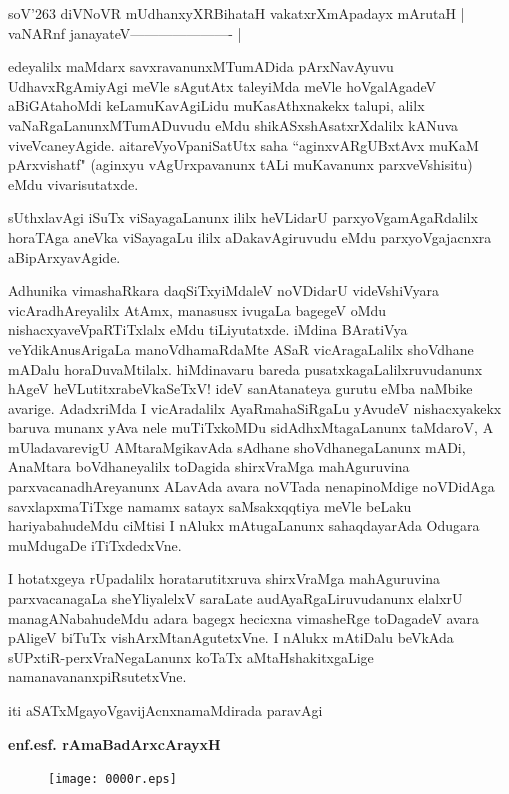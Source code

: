 \begin{shloka}
soV\char'263 diVNoVR mUdhanxyXRBihataH vakatxrXmApadayx mArutaH |\\
vaNARnf janayateV---------------------- |\\
\end{shloka}

edeyalilx maMdarx savxravanunxMTumADida pArxNavAyuvu UdhavxRgAmiyAgi meVle sAgutAtx tale\-yiMda meVle hoVgalAgadeV aBiGAtahoMdi keLamuKa\-vAgiLidu muKasAthxnakekx talupi, alilx vaNaR\-gaLa\-nunxMTu\-mADuvudu eMdu shikASx\-shAsatxrXdalilx kANuva viveVcaneyAgide. aitareVyoVpaniSatUtx saha ``aginxvARgUBxtAvx muKaM pArxvishatf" (aginxyu vAgUrxpavanunx tALi muKavanunx parxveVshisitu) eMdu vivarisutatxde.

sUthxlavAgi iSuTx viSayagaLanunx ililx heVLidarU parxyoVgamAgaRdalilx horaTAga aneVka viSaya\-gaLu ililx aDakavAgiruvudu eMdu parxyoVgajacnxra aBipArxyavAgide.

Adhunika vimashaRkara daqSiTxyiMdaleV noVDidarU videVshiVyara vicAra\-dhAreyalilx AtAmx, manasusx\- ivu\-gaLa bagegeV oMdu nishacxyaveVpaRTiTxlalx eMdu tiLiyutatxde. iMdina BAratiVya veYdikAnu\-sAri\-gaLa manoVdhamaRdaMte ASaR vicAragaLalilx shoVdhane mADalu horaDuvaMtilalx. hiMdinavaru bareda pusatxkagaLalilxruvudanunx hAgeV heVLutitxrabeVkaSeTxV! ideV sanAtanateya gurutu eMba naMbike avarige. AdadxriMda I vicAradalilx AyaRmahaSiRgaLu yAvudeV nishacxyakekx baruva munanx yAva nele muTiTx\-koMDu sidAdhxMtagaLanunx taMdaroV, A mUladavarevigU AMtaraMgikavAda sAdhane shoVdhanegaLanunx mADi, AnaMtara boVdhaneyalilx toDagida shirxVraMga mahAguruvina parxvacanadhAreyanunx ALavAda avara noVTada nenapinoMdige noVDidAga savxlapxmaTiTxge namamx satayx saMsakxqqtiya meVle beLaku hariyabahudeMdu ciMtisi I nAlukx mAtugaLanunx sahaqdayarAda Odugara muMdugaDe iTiTxdedxVne. 

I hotatx\-geya rUpa\-dalilx horatarutitxruva shirxVraMga mahAguruvina parxvacanagaLa sheYliyalelxV saraLate audAyaR\-gaLiruvu\-danunx elalxrU managANabahudeMdu adara bagegx hecicxna vimasheRge toDagadeV avara pAligeV biTuTx vishArxMta\-nAgutetxVne. I nAlukx mAtiDalu beVkAda sUPxtiR-perxVraNegaLanunx koTaTx aMtaHshakitxgaLige namana\-vananxpiRsu\-tetxVne.

\bigskip

\hfill iti aSATxMgayoVgavijAcnxnamaMdirada paravAgi

\smallskip

\hfill {\bf enf.esf. rAmaBadArxcArayxH}

\newpage

\thispagestyle{empty}
\begin{figure}[h]
\centering
{\texttt{[image: 0000r.eps]}}
\end{figure}
